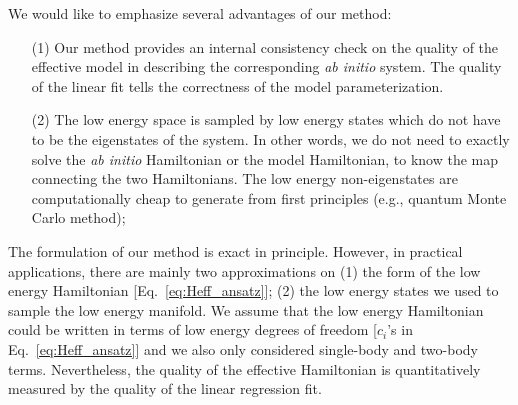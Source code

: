 We would like to emphasize several advantages of our method: 
\begin{itemize}
\item [(1)] Our method provides an internal consistency check on the quality of the effective model in describing the corresponding \textit{ab initio} system. The quality of the linear fit tells the correctness of the model parameterization. 
\item [(2)] The low energy space is sampled by low energy states which do not have to be the eigenstates of the system. In other words, we do not need to exactly solve the \textit{ab initio} Hamiltonian or the model Hamiltonian, to know the map connecting the two Hamiltonians. The low energy non-eigenstates are computationally cheap to generate from first principles (e.g., quantum Monte Carlo method); 
\end{itemize}
The formulation of our method is exact in principle. However, in practical applications, there are mainly two approximations on (1) the form of the low energy Hamiltonian [Eq.~\eqref{eq:Heff_ansatz}]; (2) the low energy states we used to sample the low energy manifold. We assume that the low energy Hamiltonian could be written in terms of low energy degrees of freedom [$c_i$'s in Eq.~\eqref{eq:Heff_ansatz}] and we also only considered single-body and two-body terms. Nevertheless, the quality of the effective Hamiltonian is quantitatively measured by the quality of the linear regression fit.
